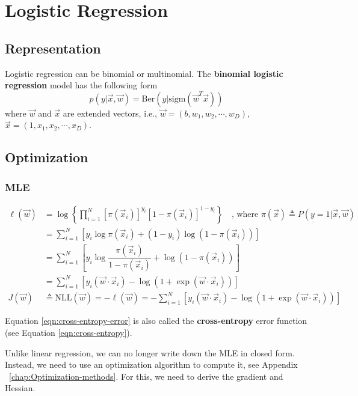 \chapter{Logistic Regression}


\section{Representation}
Logistic regression can be binomial or multinomial. The \textbf{binomial logistic regression} model has the following form
\begin{equation}
p(y|\vec{x},\vec{w})=\mathrm{Ber}(y|\mathrm{sigm}(\vec{w}^T\vec{x}))
\end{equation}
where $\vec{w}$ and $\vec{x}$ are extended vectors, i.e., $\vec{w}=(b, w_1, w_2,\cdots, w_D)$, $\vec{x}=(1, x_1, x_2,\cdots, x_D)$.


\section{Optimization}
\label{sec:binomial-LR-Optimization}

\subsection{MLE}
\begin{align}
\ell(\vec{w}) &= \log\left\{\prod\limits_{i=1}^N{\left[\pi(\vec{x}_i)\right]^{y_i}\left[1-\pi(\vec{x}_i)\right]^{1-y_i}}\right\} \quad \text{, where } \pi(\vec{x}) \triangleq P(y=1|\vec{x},\vec{w}) \nonumber \\
           &= \sum\limits_{i=1}^N\left[y_i\log\pi(\vec{x}_i)+(1-y_i)\log(1-\pi(\vec{x}_i))\right] \label{eqn:cross-entropy-error} \\
		   &= \sum\limits_{i=1}^N\left[y_i\log\dfrac{\pi(\vec{x}_i)}{1-\pi(\vec{x}_i)}+\log(1-\pi(\vec{x}_i))\right] \nonumber \\
		   &= \sum\limits_{i=1}^N\left[y_i(\vec{w}\cdot\vec{x}_i)-\log(1+\exp(\vec{w}\cdot\vec{x}_i))\right] \nonumber \\
J(\vec{w}) & \triangleq \mathrm{NLL}(\vec{w})= -\ell(\vec{w}) = -\sum\limits_{i=1}^N\left[y_i(\vec{w}\cdot\vec{x}_i)-\log(1+\exp(\vec{w}\cdot\vec{x}_i))\right] 
\end{align}

Equation \eqref{eqn:cross-entropy-error} is also called the \textbf{cross-entropy} error function (see Equation \eqref{eqn:cross-entropy}).

Unlike linear regression, we can no longer write down the MLE in closed form. Instead, we need to use an optimization algorithm to compute it, see Appendix ~\ref{chap:Optimization-methods}. For this, we need to derive the gradient and Hessian.

